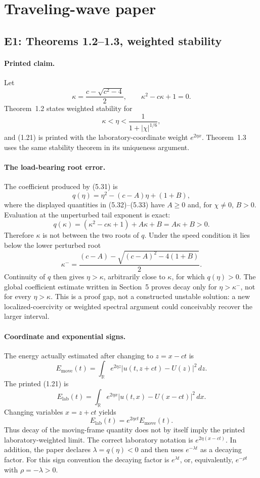 \documentclass[11pt]{article}
\newcommand{\R}{\mathbb{R}}
\newcommand{\abs}[1]{\left\lvert #1\right\rvert}
\begin{document}
\section{Traveling-wave paper}

\subsection{E1: Theorems 1.2--1.3, weighted stability}

\paragraph{Printed claim.}
Let
\[
  \kappa=\frac{c-\sqrt{c^2-4}}2,\qquad
  \kappa^2-c\kappa+1=0.
\]
Theorem~1.2 states weighted stability for
\[
  \kappa<\eta<\frac{1}{1+\abs{\chi}^{1/6}},
\]
and (1.21) is printed with the laboratory-coordinate weight
\(e^{2\eta x}\).  Theorem~1.3 uses the same stability theorem in its uniqueness
argument.

\paragraph{The load-bearing root error.}
The coefficient produced by (5.31) is
\[
  q(\eta)=\eta^2-(c-A)\eta+(1+B),
\]
where the displayed quantities in (5.32)--(5.33) have \(A\ge0\) and, for
\(\chi\ne0\), \(B>0\).  Evaluation at the unperturbed tail exponent is exact:
\[
  q(\kappa)
   =(\kappa^2-c\kappa+1)+A\kappa+B
   =A\kappa+B>0.
\]
Therefore \(\kappa\) is not between the two roots of \(q\).  Under the speed
condition it lies below the lower perturbed root
\[
  \kappa^-=\frac{(c-A)-\sqrt{(c-A)^2-4(1+B)}}2.
\]
Continuity of \(q\) then gives \(\eta>\kappa\), arbitrarily close to
\(\kappa\), for which \(q(\eta)>0\).  The global coefficient estimate written
in Section~5 proves decay only for \(\eta>\kappa^-\), not for every
\(\eta>\kappa\).  This is a proof gap, not a constructed unstable solution:
a new localized-coercivity or weighted spectral argument could conceivably
recover the larger interval.

\paragraph{Coordinate and exponential signs.}
The energy actually estimated after changing to \(z=x-ct\) is
\[
 E_{\mathrm{move}}(t)=
   \int_{\R}e^{2\eta z}\abs{u(t,z+ct)-U(z)}^2\,dz.
\]
The printed (1.21) is
\[
 E_{\mathrm{lab}}(t)=
   \int_{\R}e^{2\eta x}\abs{u(t,x)-U(x-ct)}^2\,dx.
\]
Changing variables \(x=z+ct\) yields
\[
  E_{\mathrm{lab}}(t)=e^{2\eta ct}E_{\mathrm{move}}(t).
\]
Thus decay of the moving-frame quantity does not by itself imply the printed
laboratory-weighted limit.  The correct laboratory notation is
\(e^{2\eta(x-ct)}\).  In addition, the paper declares
\(\lambda=q(\eta)<0\) and then uses \(e^{-\lambda t}\) as a decaying factor.
For this sign convention the decaying factor is \(e^{\lambda t}\), or,
equivalently, \(e^{-\rho t}\) with \(\rho=-\lambda>0\).
\end{document}
